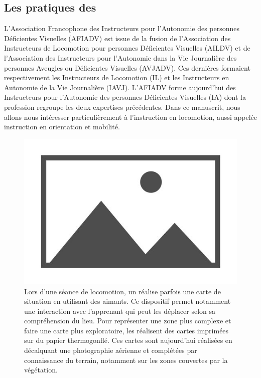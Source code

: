 \todo{}

\subsection{Les pratiques des \ipas{}}

\label{pratiques_ipas}

L'Association Francophone des Instructeurs pour l'Autonomie des personnes Déficientes Visuelles (AFIADV) est issue de la fusion de l'Association des Instructeurs de Locomotion pour personnes Déficientes Visuelles (AILDV) et de l'Association des Instructeurs pour l'Autonomie dans la Vie Journalière des personnes Aveugles ou Déficientes Visuelles (AVJADV). Ces dernières formaient respectivement les Instructeurs de Locomotion (IL) et les Instructeurs en Autonomie de la Vie Journalière (IAVJ). L'AFIADV forme aujourd'hui des Instructeurs pour l'Autonomie des personnes Déficientes Visuelles (IA) dont la profession regroupe les deux expertises précédentes. Dans ce manuscrit, nous allons nous intéresser particulièrement à l'instruction en locomotion, aussi appelée instruction en orientation et mobilité. 

\begin{figure}
    \centering
    \includegraphics{images/placeholder.jpg}
    \caption{Lors d'une séance de locomotion, un \ipa{} réalise parfois une carte de situation en utilisant des aimants. Ce dispositif permet notamment une interaction avec l'apprenant qui peut les déplacer selon sa compréhension du lieu. Pour représenter une zone plus complexe et faire une carte plus exploratoire, les \ipas{} réalisent des cartes imprimées sur du papier thermogonflé. Ces cartes sont aujourd'hui réalisées en décalquant une photographie aérienne et complétées par connaissance du terrain, notamment sur les zones couvertes par la végétation.}
    \label{fig:il_carte}
\end{figure}

